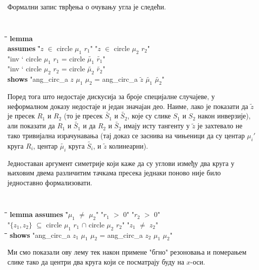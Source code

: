 Формални запис тврђења о очувању угла је следећи.

{\tt
  \begin{tabbing}
    \hspace{5mm}\=\hspace{5mm}\=\hspace{5mm}\=\hspace{5mm}\=\hspace{5mm}\=\kill
{\bf lemma } \\
 \> {\bf assumes} \= "$z$ $\in$ circle $\mu_1$ $r_1$" "$z$ $\in$ circle $\mu_2$ $r_2$"  \\
  \>               \> "inv ` circle $\mu_1$ $r_1$ = circle $\tilde{\mu_1}$ $\tilde{r_1}$"   \\
  \>               \> "inv ` circle $\mu_2$ $r_2$ = circle $\tilde{\mu_2}$ $\tilde{r_2}$"\\
  \> {\bf shows} "ang\_circ\_a $z$ $\mu_1$ $\mu_2$ = ang\_circ\_a $\tilde{z}$ $\tilde{\mu_1}$ $\tilde{\mu_2}$"
  \end{tabbing}
}

Поред тога што недостаје дискусија за броје специјалне случајеве, у
неформалном доказу недостаје и један значајан део.  Наиме, лако је
показати да $\tilde{z}$ је пресек $R_1$ и $R_2$ (то је пресек
$\tilde{S_1}$ и $\tilde{S_2}$, које су слике $S_1$ и $S_2$ након
инверзије), али показати да $R_1$ и $\tilde{S_1}$ и да $R_2$ и
$\tilde{S_2}$ имају исту тангенту у $\tilde{z}$ је захтевало не тако
тривијална израчунавања (тај доказ се заснива на чињеници да су центар
$\mu_i'$ круга $R_i$, центар $\tilde{\mu_i}$ круга $\tilde{S_i}$, и
$\tilde{z}$ колинеарни).

Једноставан аргумент симетрије који каже да су углови између два круга
у њиховим двема различитим тачкама пресека једнаки поново није било
једноставно формализовати.
{\tt
  \begin{tabbing}
    \hspace{5mm}\=\hspace{5mm}\=\hspace{5mm}\=\hspace{5mm}\=\hspace{5mm}\=\kill
{\bf lemma} {\bf assumes} \="$\mu_1$ $\neq$ $\mu_2$" "$r_1$ $>$ 0" "$r_2$ $>$ 0"\\
\>"$\{z_1, z_2\}$ $\subseteq$ circle $\mu_1$ $r_1$ $\cap$ circle $\mu_2$ $r_2$" "$z_1$ $\neq$ $z_2$" \\
    \hspace{5mm}\=\hspace{5mm}\=\hspace{5mm}\=\hspace{5mm}\=\hspace{5mm}\=\kill
  \> {\bf shows} "ang\_circ\_a $z_1$ $\mu_1$ $\mu_2$ = ang\_circ\_a $z_2$ $\mu_1$ $\mu_2$"
  \end{tabbing}
}
\noindent Ми смо показали ову лему тек након примене "бгно" резоновања
и померањем слике тако да центри два круга који се посматрају буду на
$x$-оси.

